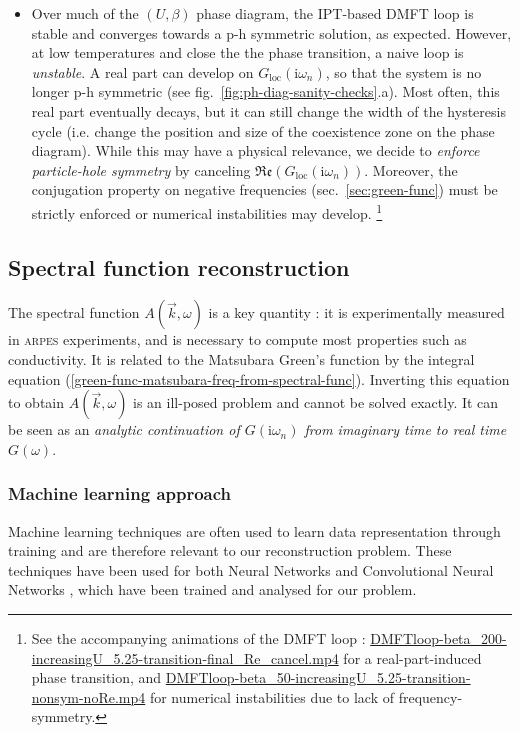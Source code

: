 \documentclass[reprint,amsmath,amssymb,aps,pra]{revtex4-2}
\newcommand{\tmname}[1]{\textsc{#1}}
\newcommand{\iwn}{\mathrm{i}\omega_n}
\begin{document}
\begin{itemize}
    \item Over much of the $(U,\beta)$ phase diagram, the IPT-based DMFT loop is stable and converges towards a p-h symmetric solution, as expected. However, at low temperatures and close the the phase transition, a naive loop is \emph{unstable}. A real part can develop on $G_\text{loc}(\iwn)$, so that the system is no longer p-h symmetric (see fig.\ \ref{fig:ph-diag-sanity-checks}.a). Most often, this real part eventually decays, but it can still change the width of the hysteresis cycle (i.e. change the position and size of the coexistence zone on the phase diagram). While this may have a physical relevance, we decide to \emph{enforce particle-hole symmetry} by canceling $\mathfrak{Re}(G_\text{loc}(\iwn))$. Moreover, the conjugation property on negative frequencies (sec.\ \ref{sec:green-func}) must be strictly enforced or numerical instabilities may develop. \footnote{See the accompanying animations of the DMFT loop : \url{DMFTloop-beta_200-increasingU_5.25-transition-final_Re_cancel.mp4} for a real-part-induced phase transition, and \url{DMFTloop-beta_50-increasingU_5.25-transition-nonsym-noRe.mp4} for numerical instabilities due to lack of frequency-symmetry.}
\end{itemize}

\subsection{Spectral function reconstruction}

The spectral function $A (\vec{k}, \omega)$ is a key quantity : it is experimentally measured in \tmname{arpes} experiments, and is necessary to compute most properties such as conductivity. It is related to the Matsubara Green's function by the integral equation (\ref{green-func-matsubara-freq-from-spectral-func}). Inverting this equation to obtain $A (\vec{k}, \omega)$ is an ill-posed problem and cannot be solved exactly. It can be seen as an \emph{analytic continuation of $G(\iwn)$ from imaginary time to real time $G(\omega)$}.

\subsubsection{Machine learning approach}
Machine learning techniques are often used to learn data representation through training and are therefore relevant to our reconstruction problem. These techniques have been used for both Neural Networks \cite{NN_article} and Convolutional Neural Networks \cite{CNN_article}, which have been trained and analysed for our problem.
\end{document}
